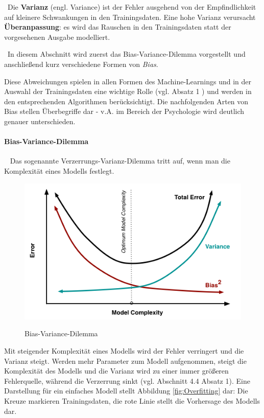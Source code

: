 ~\newline Die \textbf{Varianz} (engl. Variance) ist der Fehler ausgehend von der Empfindlichkeit auf kleinere Schwankungen in den Trainingsdaten. Eine hohe Varianz verursacht \textbf{Überanpassung}: es wird das Rauschen in den Trainingsdaten statt der vorgesehenen Ausgabe modelliert.


~\newline In diesem Abschnitt wird zuerst das Bias-Variance-Dilemma vorgestellt und anschließend kurz verschiedene Formen von \textit{Bias}. 

Diese Abweichungen spielen in allen Formen des Machine-Learnings und in der Auswahl der Trainingsdaten eine wichtige Rolle (vgl. \cite{BiasTypes} Absatz 1 ) und werden in den entsprechenden Algorithmen berücksichtigt. Die nachfolgenden Arten von Bias stellen Überbegriffe dar - v.A. im Bereich der Psychologie wird deutlich genauer unterschieden.
\paragraph{Bias-Variance-Dilemma} ~\newline
Das sogenannte Verzerrungs-Varianz-Dilemma tritt auf, wenn man die Komplexität eines Modells festlegt.
\begin{figure}[h]
	\begin{center}
		\includegraphics[width=0.6\linewidth]{Bilder/BiasVariance}
		\caption[Bias-Variance-Dilemma: \newline \tiny \url{
			http://scott.fortmann-roe.com/docs/BiasVariance.html}]{Bias-Variance-Dilemma} \normalsize
		\label{fig:BVDilemma}
	\end{center}
\end{figure}
Mit steigender Komplexität eines Modells wird der Fehler verringert und die Varianz steigt. Werden mehr Parameter zum Modell aufgenommen, steigt die Komplexität des Modells und die Varianz wird zu einer immer größeren Fehlerquelle, während die Verzerrung sinkt (vgl. \cite{BiasVarianceDilemma} Abschnitt 4.4 Absatz 1). Eine Darstellung für ein einfaches Modell stellt Abbildung \ref{fig:Overfitting} dar: Die Kreuze markieren Trainingsdaten, die rote Linie stellt die Vorhersage des Modells dar. 

